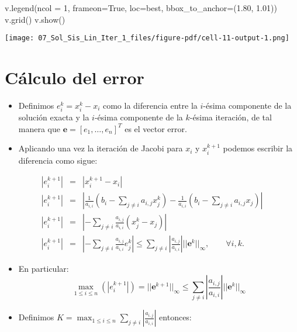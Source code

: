 \documentclass[
  letterpaper,
  DIV=11,
  numbers=noendperiod]{scrreprt}
\newenvironment{Shaded}{\begin{snugshade}}{\end{snugshade}}
\newcommand{\DecValTok}[1]{\textcolor[rgb]{0.68,0.00,0.00}{#1}}
\newcommand{\FloatTok}[1]{\textcolor[rgb]{0.68,0.00,0.00}{#1}}
\newcommand{\NormalTok}[1]{\textcolor[rgb]{0.00,0.23,0.31}{#1}}
\newcommand{\OperatorTok}[1]{\textcolor[rgb]{0.37,0.37,0.37}{#1}}
\newcommand{\StringTok}[1]{\textcolor[rgb]{0.13,0.47,0.30}{#1}}
\newcommand{\VariableTok}[1]{\textcolor[rgb]{0.07,0.07,0.07}{#1}}
\begin{document}
\begin{Shaded}
\begin{Highlighting}[]
\NormalTok{v.legend(ncol }\OperatorTok{=} \DecValTok{1}\NormalTok{, frameon}\OperatorTok{=}\VariableTok{True}\NormalTok{, loc}\OperatorTok{=}\StringTok{\textquotesingle{}best\textquotesingle{}}\NormalTok{, bbox\_to\_anchor}\OperatorTok{=}\NormalTok{(}\FloatTok{1.80}\NormalTok{, }\FloatTok{1.01}\NormalTok{))}
\NormalTok{v.grid()}
\NormalTok{v.show()}
\end{Highlighting}
\end{Shaded}

\texttt{[image: 07\_Sol\_Sis\_Lin\_Iter\_1\_files/figure-pdf/cell-11-output-1.png]}

\section{Cálculo del error}\label{cuxe1lculo-del-error}

\begin{itemize}
\item
  Definimos \(e_i^k = x_i^k - x_i\) como la diferencia entre la
  \(i\)-ésima componente de la solución exacta y la \(i\)-ésima
  componente de la \(k\)-ésima iteración, de tal manera que
  \(\mathbf{e} = [e_1, \dots, e_n]^T\) es el vector error.
\item
  Aplicando una vez la iteración de Jacobi para \(x_i\) y \(x_i^{k+1}\)
  podemos escribir la diferencia como sigue:
\end{itemize}

\[
\begin{eqnarray*}
\left| e_i^{k+1} \right| & = &\left| x_i^{k+1} - x_i  \right| \\
\left| e_i^{k+1} \right| & = & \left|
\frac{1}{a_{i,i}} \left(b_i - \sum_{j \neq i} a_{i,j} x_j^{k} \right) -
\frac{1}{a_{i,i}} \left(b_i - \sum_{j \neq i} a_{i,j} x_j \right) \right| \\
\left| e_i^{k+1} \right| & = & \left| -\sum_{j \neq i} \frac{a_{i,j}}{a_{i,i}} (x_j^k - x_j)\right| \\
\left| e_i^{k+1} \right| & = & \left| -\sum_{j \neq i} \frac{a_{i,j}}{a_{i,i}} e_j^k \right| 
\le \sum_{j \neq i} \left| \frac{a_{i,j}}{a_{i,i}} \right| || \mathbf{e}^k ||_\infty, \qquad \forall i, k .
\end{eqnarray*}
\]

\begin{itemize}
\item
  En particular: \[
  \max_{1 \le i \le n} \left( \left| e_i^{k+1} \right| \right) =  || \mathbf{e}^{k+1} ||_\infty
   \le \sum_{j \neq i} \left| \frac{a_{i,j}}{a_{i,i}} \right| || \mathbf{e}^k ||_\infty
  \]
\item
  Definimos
  \(\displaystyle K = \max_{1 \le i \le n} \sum_{j \neq i} \left| \frac{a_{i,j}}{a_{i,i}} \right|\)
  entonces:
\end{itemize}
\end{document}
